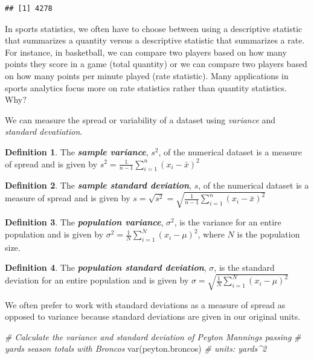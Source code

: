 \documentclass[
  11pt,
]{book}
\newenvironment{Shaded}{\begin{snugshade}}{\end{snugshade}}
\newcommand{\CommentTok}[1]{\textcolor[rgb]{0.56,0.35,0.01}{\textit{#1}}}
\newcommand{\FunctionTok}[1]{\textcolor[rgb]{0.00,0.00,0.00}{#1}}
\newcommand{\NormalTok}[1]{#1}
\theoremstyle{definition}
\newtheorem{definition}{Definition}[chapter]
\theoremstyle{definition}
\theoremstyle{definition}
\theoremstyle{definition}
\theoremstyle{remark}
\begin{document}
\begin{verbatim}
## [1] 4278
\end{verbatim}

In sports statistics, we often have to choose between using a descriptive statistic that summarizes a quantity versus a descriptive statistic that summarizes a rate. For instance, in basketball, we can compare two players based on how many points they score in a game (total quantity) or we can compare two players based on how many points per minute played (rate statistic). Many applications in sports analytics focus more on rate statistics rather than quantity statistics. Why?

We can measure the spread or variability of a dataset using \emph{variance} and \emph{standard devatiation}.

\begin{definition}
The \textbf{\emph{sample variance}}, \(s^2\), of the numerical dataset is a measure of spread and is given by \(s^2 = \frac{1}{n-1}\sum_{i=1}^n (x_i - \bar{x})^2\)
\end{definition}

\begin{definition}
The \textbf{\emph{sample standard deviation}}, \(s\), of the numerical dataset is a measure of spread and is given by \(s = \sqrt{s^2} = \sqrt{\frac{1}{n-1}\sum_{i=1}^n (x_i - \bar{x})^2}\)
\end{definition}

\begin{definition}
The \textbf{\emph{population variance}}, \(\sigma^2\), is the variance for an entire population and is given by \(\sigma^2 = \frac{1}{N} \sum_{i=1}^N (x_i - \mu)^2\), where \(N\) is the population size.
\end{definition}

\begin{definition}
The \textbf{\emph{population standard deviation}}, \(\sigma\), is the standard deviation for an entire population and is given by \(\sigma = \sqrt{\frac{1}{N} \sum_{i=1}^N (x_i - \mu)^2}\)
\end{definition}

We often prefer to work with standard deviations as a measure of spread as opposed to variance because standard deviations are given in our original units.

\begin{Shaded}
\begin{Highlighting}[]
\CommentTok{\# Calculate the variance and standard deviation of Peyton Manning\textquotesingle{}s passing}
\CommentTok{\# yards season totals with Broncos}
\FunctionTok{var}\NormalTok{(peyton.broncos)  }\CommentTok{\# units: yards\^{}2}
\end{Highlighting}
\end{Shaded}
\end{document}
